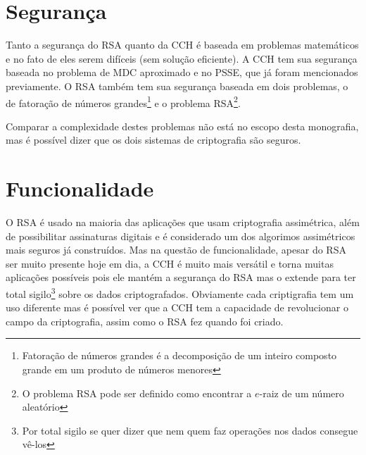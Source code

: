 \section{Segurança}
	Tanto a segurança do RSA quanto da CCH é baseada em problemas matemáticos e no fato de eles serem difíceis (sem solução eficiente).
	A CCH tem sua segurança baseada no problema de MDC aproximado e no PSSE, que já foram mencionados previamente. O RSA também tem sua segurança baseada em dois problemas, o de fatoração de números grandes\footnote{Fatoração de números grandes é a decomposição de um inteiro composto grande em um produto de números menores} e o problema RSA\footnote{O problema RSA pode ser definido como encontrar a $e$-raiz de um número aleatório}.
	
	Comparar a complexidade destes problemas não está no escopo desta monografia, mas é possível dizer que os dois sistemas de criptografia são seguros.
	
\section{Funcionalidade}
	O RSA é usado na maioria das aplicações que usam criptografia assimétrica, além de possibilitar assinaturas digitais e é considerado um dos algorimos assimétricos mais seguros já construídos.
	Mas na questão de funcionalidade, apesar do RSA ser muito presente hoje em dia, a CCH é muito mais versátil e torna muitas aplicações possíveis pois ele mantém a segurança do RSA mas o extende para ter total sigilo\footnote{Por total sigilo se quer dizer que nem quem faz operações nos dados consegue vê-los} sobre os dados criptografados.
	Obviamente cada criptigrafia tem um uso diferente mas é possível ver que a CCH tem a capacidade de revolucionar o campo da criptografia, assim como o RSA fez quando foi criado.